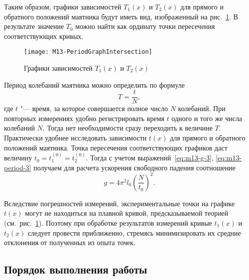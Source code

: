 \documentclass[a4paper, 12pt]{extarticle}
\begin{document}
Таким образом, графики зависимостей $T_1(x)$ и $T_2(x)$ для прямого и обратного положений маятника будут иметь вид, изображенный на рис.~\ref{fig:m13-plot-2}. В результате значение $T_0$ можно найти как ординату точки пересечения соответствующих кривых. %

\begin{figure}[h]
\begin{center}
\texttt{[image: M13-PeriodGraphIntersection]}
\end{center}
\caption{Графики зависимостей $T_1(x)$ и $T_2(x)$ \label{fig:m13-plot-2}}
\end{figure}

Период колебаний маятника можно определить по формуле
\begin{equation}
\label{eq:m13-period-3}
T = \frac{t}{N},
\end{equation}
где $t$ "--- время, за которое совершается полное число $N$ колебаний.
При повторных измерениях удобно регистрировать время $t$ одного и того же числа колебаний $N$. Тогда нет необходимости сразу переходить к величине $T$.  Практически удобнее исследовать зависимости $t(x)$ для прямого и обратного положений маятника. Точка пересечения соответствующих графиков даст величину $ t_0 = t_1^{(0)} = t_2^{(0)}$. Тогда с учетом выражений~\eqref{eq:m13-g-3}, \eqref{eq:m13-period-3} получаем для расчета ускорения свободного падения соотношение %
\begin{equation}
\label{eq:m13-g-4}
g = 4 \pi^2 l_0 \left( \frac{N}{t_0}\right) ^2.
\end{equation}

Вследствие погрешностей измерений, экспериментальные точки на графике $t(x)$ могут не находиться на плавной кривой, предсказываемой теорией (см.~рис.~\ref{fig:m13-plot-2}). Поэтому при обработке результатов измерений кривые $t_1(x)$ и $t_2(x)$ следует провести приближенно, стремясь минимизировать их средние отклонения от полученных из опыта точек. %

\subsection{Порядок выполнения работы}
\end{document}
